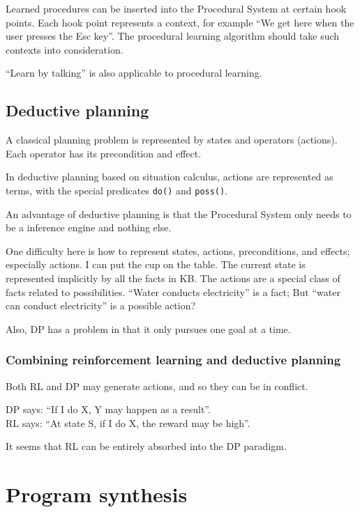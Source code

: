 \documentclass[a4paper]{report}
\begin{document}
Learned procedures can be inserted into the Procedural System at certain hook points.  Each hook point represents a context, for example ``We get here when the user presses the Esc key''.  The procedural learning algorithm should take such contexts into consideration.

``Learn by talking'' is also applicable to procedural learning.

\section{Deductive planning}
\label{sec:deductive-planning}

A classical planning problem is represented by states and operators (actions).  Each operator has its precondition and effect.

In deductive planning based on situation calculus, actions are represented as terms, with the special predicates \texttt{do()} and \texttt{poss()}.

An advantage of deductive planning is that the Procedural System only needs to be a inference engine and nothing else.

One difficulty here is how to represent states, actions, preconditions, and effects;  especially actions.  I can put the cup on the table.  The current state is represented implicitly by all the facts in KB.  The actions are a special class of facts related to possibilities.  ``Water conducts electricity'' is a fact;  But ``water can conduct electricity'' is a possible action?  

Also, DP has a problem in that it only pursues one goal at a time.

\subsection{Combining reinforcement learning and deductive planning}

Both RL and DP may generate actions, and so they can be in conflict.

DP says:  ``If I do X, Y may happen as a result''.\\
RL says:  ``At state S, if I do X, the reward may be high''.

It seems that RL can be entirely absorbed into the DP paradigm.

\chapter{Program synthesis}
\minitoc
\end{document}
